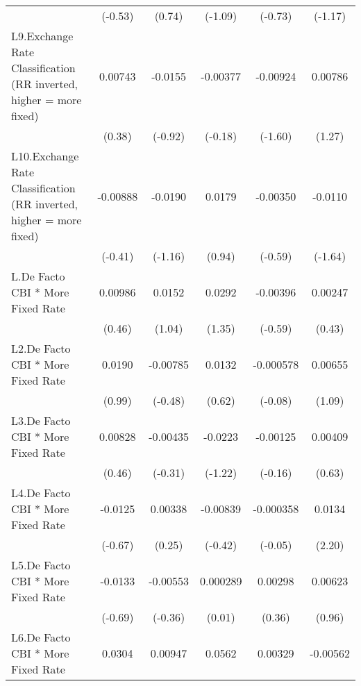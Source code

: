 {\begin{tabular}{l*{5}{c}}
                &  (-0.53)         &   (0.74)         &  (-1.09)         &  (-0.73)         &  (-1.17)         \\
[1em]
L9.Exchange Rate Classification (RR inverted, higher = more fixed)&  0.00743         &  -0.0155         & -0.00377         & -0.00924         &  0.00786         \\
                &   (0.38)         &  (-0.92)         &  (-0.18)         &  (-1.60)         &   (1.27)         \\
[1em]
L10.Exchange Rate Classification (RR inverted, higher = more fixed)& -0.00888         &  -0.0190         &   0.0179         & -0.00350         &  -0.0110         \\
                &  (-0.41)         &  (-1.16)         &   (0.94)         &  (-0.59)         &  (-1.64)         \\
[1em]
L.De Facto CBI * More Fixed Rate&  0.00986         &   0.0152         &   0.0292         & -0.00396         &  0.00247         \\
                &   (0.46)         &   (1.04)         &   (1.35)         &  (-0.59)         &   (0.43)         \\
[1em]
L2.De Facto CBI * More Fixed Rate&   0.0190         & -0.00785         &   0.0132         &-0.000578         &  0.00655         \\
                &   (0.99)         &  (-0.48)         &   (0.62)         &  (-0.08)         &   (1.09)         \\
[1em]
L3.De Facto CBI * More Fixed Rate&  0.00828         & -0.00435         &  -0.0223         & -0.00125         &  0.00409         \\
                &   (0.46)         &  (-0.31)         &  (-1.22)         &  (-0.16)         &   (0.63)         \\
[1em]
L4.De Facto CBI * More Fixed Rate&  -0.0125         &  0.00338         & -0.00839         &-0.000358         &   0.0134\sym{*}  \\
                &  (-0.67)         &   (0.25)         &  (-0.42)         &  (-0.05)         &   (2.20)         \\
[1em]
L5.De Facto CBI * More Fixed Rate&  -0.0133         & -0.00553         & 0.000289         &  0.00298         &  0.00623         \\
                &  (-0.69)         &  (-0.36)         &   (0.01)         &   (0.36)         &   (0.96)         \\
[1em]
L6.De Facto CBI * More Fixed Rate&   0.0304         &  0.00947         &   0.0562\sym{**} &  0.00329         & -0.00562         \\

\end{tabular}}
